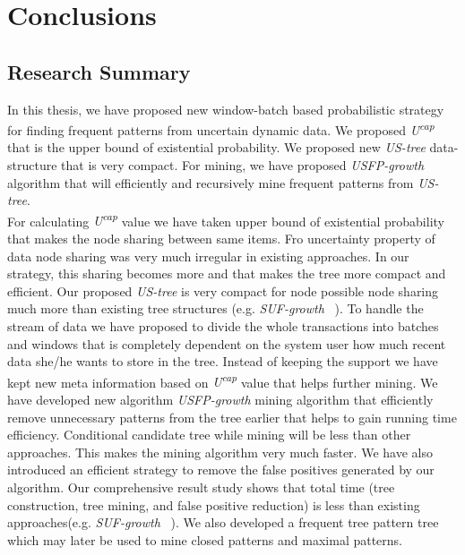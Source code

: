 \chapter{Conclusions}
\section{Research Summary}
In this thesis, we have proposed new window-batch based probabilistic strategy for finding frequent patterns from uncertain dynamic data. We proposed  \emph{U\textsuperscript{cap}} that is the upper bound of existential probability. We proposed new \emph{US-tree} data-structure that is very compact. For mining, we have proposed \emph{USFP-growth} algorithm that will efficiently and recursively mine frequent patterns from \emph{US-tree}.\\
For calculating \emph{U\textsuperscript{cap}} value we have taken upper bound of existential probability that makes the node sharing between same items. Fro uncertainty property of data node sharing was very much irregular in existing approaches. In our strategy, this sharing becomes more and that makes the tree more compact and efficient. Our proposed \emph{US-tree} is very compact for node possible node sharing much more than existing tree structures (e.g. \emph{SUF-growth} ~\cite{suf_growth}). To handle the stream of data we have proposed to divide the whole transactions into batches and windows that is completely dependent on the system user how much recent data she/he wants to store in the tree. Instead of keeping the support we have kept new meta information based on \emph{U\textsuperscript{cap}} value that helps further mining. We have developed new algorithm \emph{USFP-growth} mining algorithm that efficiently remove unnecessary patterns from the tree earlier that helps to gain running time efficiency. Conditional candidate tree while mining will be less than other approaches. This makes the mining algorithm very much faster. We have also introduced an efficient strategy to remove the false positives generated by our algorithm. Our comprehensive result study shows that total time (tree construction, tree mining, and false positive reduction) is less than existing approaches(e.g. \emph{SUF-growth} ~\cite{suf_growth}). We also developed a frequent tree pattern tree which may later be used to mine closed patterns and maximal patterns.
